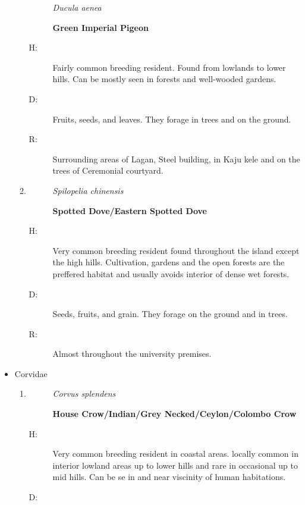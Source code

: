 \begin{itemize}
\begin{enumerate}
\begin{description}
\item[]%
\textit{Ducula aenea}%
\item[]%
\textbf{Green Imperial Pigeon}%
\end{description}%
\begin{description}%
\item[H: ]%
Fairly common breeding resident. Found from lowlands to lower hills. Can be mostly seen in forests and well{-}wooded gardens.%
\item[D: ]%
Fruits, seeds, and leaves. They forage in trees and on the ground.%
\item[R: ]%
Surrounding areas of Lagan, Steel building, in Kaju kele and on the trees of Ceremonial courtyard.%
\end{description}%
\item%
\begin{description}%
\item[]%
\textit{Spilopelia chinensis}%
\item[]%
\textbf{Spotted Dove/Eastern Spotted Dove}%
\end{description}%
\begin{description}%
\item[H: ]%
Very common breeding resident found throughout the island except the high hills. Cultivation, gardens and the open forests are the preffered habitat and usually avoids interior of dense wet forests.%
\item[D: ]%
Seeds, fruits, and grain. They forage on the ground and in trees.%
\item[R: ]%
Almost throughout the university premises.%
\end{description}%
\end{enumerate}%
\item%
Corvidae%
\begin{enumerate}%
\item%
\begin{description}%
\item[]%
\textit{Corvus splendens}%
\item[]%
\textbf{House Crow/Indian/Grey Necked/Ceylon/Colombo Crow}%
\end{description}%
\begin{description}%
\item[H: ]%
Very common breeding resident in coastal areas. locally common in interior lowland areas up to lower hills and rare in occasional up to mid hills. Can be se in and near viscinity of human habitations.%
\item[D: ]%

\end{description}
\end{enumerate}
\end{itemize}
